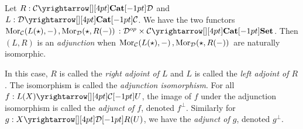 \begin{dfn}[Adjunction]
  \hypertarget{adjunction}{}
  
  Let $R : \map{\CC}{\DD}{\CAT}{}$ and $L : \map{\DD}{\CC}{\CAT}{}$.
  We have the two functors 
  $\mor{L(\star)}{-}{\CC}, \mor{\star}{R(-)}{\DD} : 
  \map{\DD\op\times\CC}{\SET}{\CAT}{}$.
  Then $(L,R)$ is an \emph{adjunction} when 
  $\mathrm{Mor}_{\mathcal{C}}(L(\star), -)\,, \mathrm{Mor}_{\mathcal{D}}(\star, R(-))\,$
  are naturally isomorphic. 
  
  In this case, 
  $R$ is called the \emph{right adjoint of $L$}
  and $L$ is called the \emph{left adjoint of $R$}.
  The isomorphism is called the \emph{adjunction isomorphism}. 
  For all $f : \map{L(X)}{U}{\CC}{}$,
  the image of $f$ under the adjunction isomorphism is called 
  the \emph{adjunct of $f$}, denoted $f^\bot$. 
  Similarly for $g : \map{X}{R(U)}{\DD}{}$, 
  we have the \emph{adjunct of $g$}, denoted $g^\bot$.
\end{dfn}

